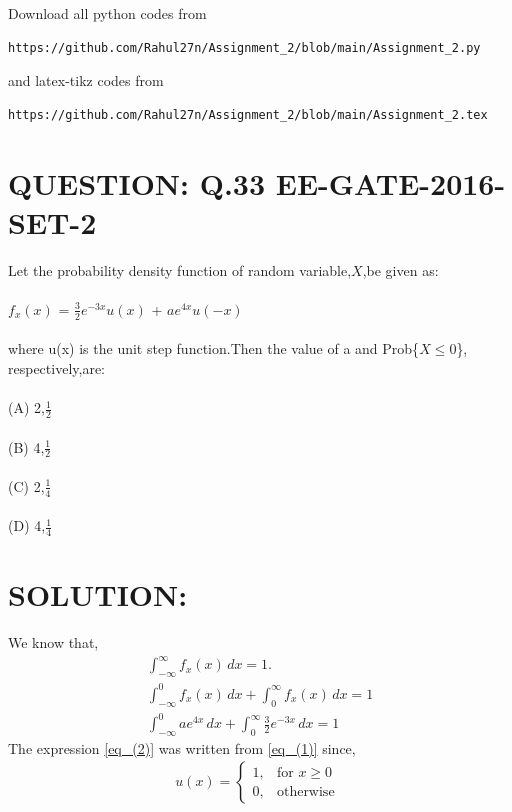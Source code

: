 \documentclass[journal,12pt,twocolumn]{IEEEtran}
\begin{document}
Download all python codes from 
\begin{lstlisting}
https://github.com/Rahul27n/Assignment_2/blob/main/Assignment_2.py
\end{lstlisting}
%
and latex-tikz codes from 
%
\begin{lstlisting}
https://github.com/Rahul27n/Assignment_2/blob/main/Assignment_2.tex
\end{lstlisting}
\vspace{0.5cm}
\section{QUESTION: Q.33 EE-GATE-2016-SET-2}
\vspace{0.5cm}

Let the probability density function of random variable,$X$,be given as:\\
\\$f_x(x)$ = $\frac{3}{2}$$e^{-3x}$${u(x)}$ + $a$$e^{4x}$${u(-x)}$\\
\\where u(x) is the unit step function.Then the value of a and Prob\{$X\leq0$\}, respectively,are:\\
\\(A) 2,$\frac{1}{2}$\\
\\(B) 4,$\frac{1}{2}$\\
\\(C) 2,$\frac{1}{4}$\\
\\(D) 4,$\frac{1}{4}$\\

\section{SOLUTION:}
\vspace{0.5cm}

We know that,
\begin{align}
\int_{-\infty}^{\infty}{f_x(x)}\,dx = 1.\\
\int_{-\infty}^{0}{f_x(x)}\,dx +\int_{0}^{\infty}{f_x(x)}\,dx = 1\label{eq_(1)}\\
\int_{-\infty}^{0}{ae^{4x}}\,dx +\int_{0}^{\infty}{\frac{3}{2}e^{-3x}}\,dx = 1\label{eq_(2)}
\end{align}
The expression \eqref{eq_(2)} was written from \eqref{eq_(1)} since,
\begin{align*}
  u(x) = 
  \begin{cases}
  1, & \text{for } x \geq 0\\
  0, & \text{otherwise } 
  \end{cases}
\end{align*}
\end{document}
